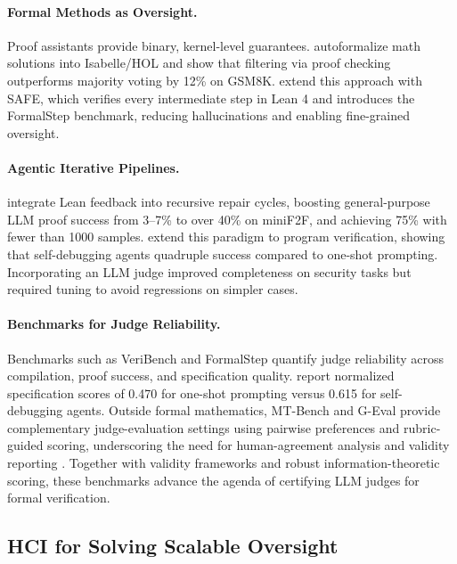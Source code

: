 \paragraph{Formal Methods as Oversight.}
Proof assistants provide binary, kernel-level guarantees. \citet{zhou2024donttrustverify} autoformalize math solutions into Isabelle/HOL and show that filtering via proof checking outperforms majority voting by 12\% on GSM8K. \citet{liu2025safe} extend this approach with SAFE, which verifies every intermediate step in Lean 4 and introduces the FormalStep benchmark, reducing hallucinations and enabling fine-grained oversight.

\paragraph{Agentic Iterative Pipelines.}
\citet{ospanov2023apollo} integrate Lean feedback into recursive repair cycles, boosting general-purpose LLM proof success from 3--7\% to over 40\% on miniF2F, and achieving 75\% with fewer than 1000 samples. \citet{miranda2025veribench} extend this paradigm to program verification, showing that self-debugging agents quadruple success compared to one-shot prompting. 
Incorporating an LLM judge improved completeness on security tasks but required tuning to avoid regressions on simpler cases.

\paragraph{Benchmarks for Judge Reliability.}
Benchmarks such as VeriBench and FormalStep quantify judge reliability across compilation, proof success, and specification quality. 
\citet{miranda2025veribench} report normalized specification scores of 0.470 for one-shot prompting versus 0.615 for self-debugging agents. 
Outside formal mathematics, MT-Bench and G-Eval provide complementary judge-evaluation settings using pairwise preferences and rubric-guided scoring, underscoring the need for human-agreement analysis and validity reporting \citep{Zheng2023MTBench,Liu2023GEval}.
Together with validity frameworks and robust information-theoretic scoring, these benchmarks advance the agenda of certifying LLM judges for formal verification.

\subsection{HCI for Solving Scalable Oversight}

